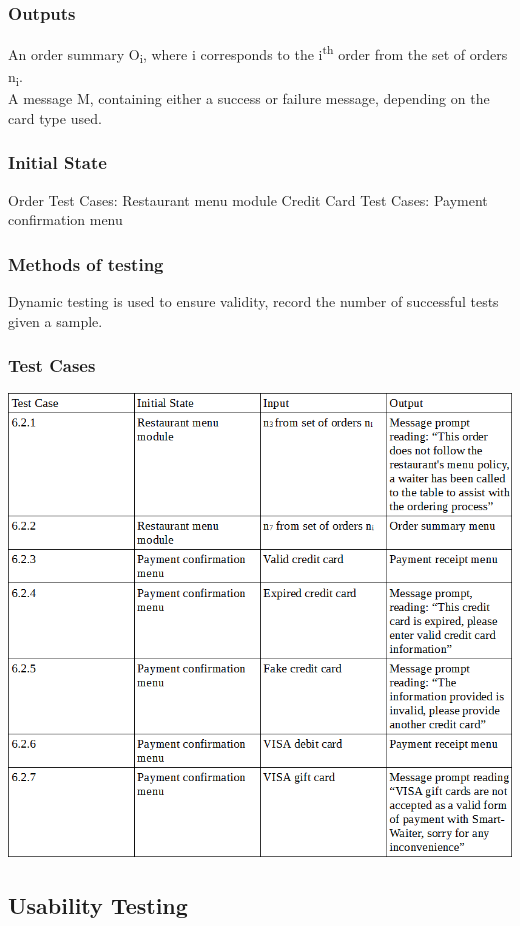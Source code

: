 \documentclass[12pt]{article}
\begin{document}
\subsubsection{Outputs}
An order summary \texorpdfstring{O\textsubscript{i}}{Oi}, where i corresponds to the \texorpdfstring{i\textsuperscript{th}}{ith} order from the set of orders \texorpdfstring{n\textsubscript{i}}{ni}. \\
A message M, containing either a success or failure message, depending on the card type used. 
\subsubsection{Initial State}
Order Test Cases: Restaurant menu module
Credit Card Test Cases: Payment confirmation menu
\subsubsection{Methods of testing}
Dynamic testing is used to ensure validity, record the number of successful tests given a sample.
\subsubsection{Test Cases}
\includegraphics[width=\textwidth,height=\textheight,keepaspectratio]{orderTransactionTC.png}

\subsection{Usability Testing}
\end{document}
